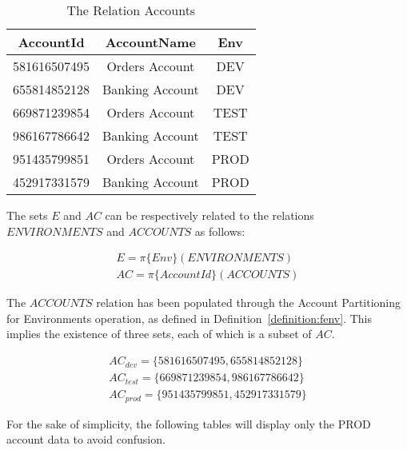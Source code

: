 \begin{table}[h]
    \caption{The Relation Accounts}
    \label{table:table-accounts}
    \begin{center}
    \begin{tabular}{|c|c|c|}
    \hline
    AccountId & AccountName & Env\\
    \hline
    581616507495 & Orders Account & DEV \\
    \hline
    655814852128 & Banking Account & DEV \\
    \hline
    669871239854 & Orders Account & TEST \\
    \hline
    986167786642 & Banking Account & TEST \\
    \hline
    951435799851 & Orders Account & PROD \\
    \hline
    452917331579 & Banking Account & PROD \\
    \hline
    \end{tabular}
    \end{center}
\end{table}

The sets $E$ and $AC$ can be respectively related to the relations $ENVIRONMENTS$ and $ACCOUNTS$ as follows:

\begin{equation*}
    \begin{gathered}
        E = \pi{\{Env\}}(ENVIRONMENTS) \\
        AC = \pi{\{AccountId\}}(ACCOUNTS)
    \end{gathered}
\end{equation*}

\vspace{15pt}

The $ACCOUNTS$ relation has been populated through the Account Partitioning for Environments operation, as defined in Definition~\ref{definition:fenv}.
This implies the existence of three sets, each of which is a subset of $AC$.

\begin{equation*}
    \begin{gathered}
        AC_{dev} = \{581616507495, 655814852128\} \\
        AC_{test} = \{669871239854, 986167786642\} \\
        AC_{prod} = \{951435799851, 452917331579\}
    \end{gathered}
\end{equation*}

\begin{boxF}
    For the sake of simplicity, the following tables will display only the PROD account data to avoid confusion.
\end{boxF}

